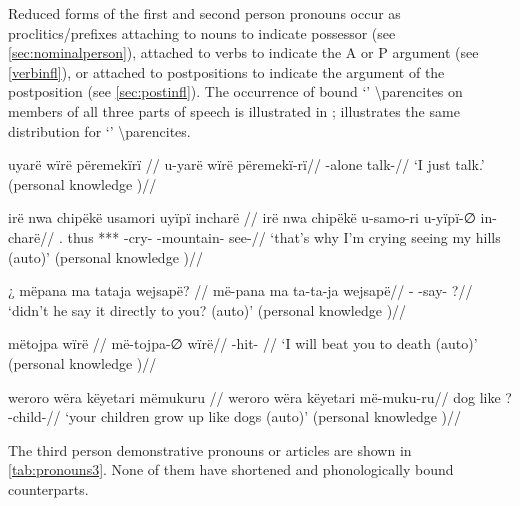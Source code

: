 \documentclass{memoir}
\begin{document}
Reduced forms of the first and second person pronouns occur as
proclitics/prefixes attaching to nouns to indicate possessor (see
\cref{sec:nominalperson}), attached to verbs to indicate the A or P
argument (see \cref{verbinfl}), or attached to postpositions to indicate
the argument of the postposition (see \cref{sec:postinfl}). The
occurrence of bound  `' \textbackslash parencites on
members of all three parts of speech is illustrated in
;  illustrates the same distribution
for  `' \textbackslash parencites.

\pex\label{1marking}    
\a \label{convrisamaj-46}
\begingl \glpreamble uyarë wïrë përemekïrï //
\gla u-yarë wïrë përemekï-rï//
\glb {}-alone  talk-//
\glft ‘I just talk.’ (personal knowledge
)//
\endgl

    
\a \label{histyarirdi-723}
\begingl \glpreamble irë nwa chipëkë usamori uyïpï incharë //
\gla irë nwa chipëkë u-samo-ri u-yïpï-∅ in-charë//
\glb {}. thus *** -cry- -mountain- see-//
\glft ‘that's why I'm crying seeing my hills (auto)’ (personal knowledge
)//
\endgl

\xe

\pex\label{2marking}    
\a \label{ctovarmafl-443}
\begingl \glpreamble ¿ mëpana ma tataja wejsapë? //
\gla më-pana ma ta-ta-ja wejsapë//
\glb {}-  -say- ?//
\glft ‘didn't he say it directly to you? (auto)’ (personal knowledge
)//
\endgl

    
\a \label{histpajirdi-114}
\begingl \glpreamble mëtojpa wïrë //
\gla më-tojpa-∅ wïrë//
\glb {}-hit- //
\glft ‘I will beat you to death (auto)’ (personal knowledge
)//
\endgl

    
\a \label{histyarirdi-160}
\begingl \glpreamble weroro wëra këyetari mëmukuru //
\gla weroro wëra këyetari më-muku-ru//
\glb dog like ? -child-//
\glft ‘your children grow up like dogs (auto)’ (personal knowledge
)//
\endgl

\xe

The third person demonstrative pronouns or articles are shown in
\cref{tab:pronouns3}. None of them have shortened and phonologically
bound counterparts.
\end{document}
